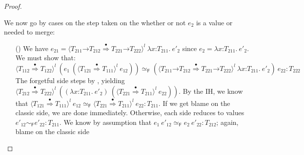 \documentclass[9pt]{extarticle}
\newcommand{\ottnt}[1]{\mathit{#1}}
\newcommand{\ottsym}[1]{#1}
\begin{document}
{\begin{lemma}
\begin{proof}
{\begin{itemize}
      We now go by cases on the step taken on the whether or not
      $\ottnt{e_{{\mathrm{2}}}}$ is a value or needed to merge:
\begin{itemize}
      \item[(\V{ProxyF})] We have $\ottnt{e_{{\mathrm{21}}}}  \ottsym{=}   \langle   \ottnt{T_{{\mathrm{211}}}} \mathord{ \rightarrow } \ottnt{T_{{\mathrm{212}}}}   \mathord{ \overset{\bullet}{\Rightarrow} }   \ottnt{T_{{\mathrm{221}}}} \mathord{ \rightarrow } \ottnt{T_{{\mathrm{222}}}}   \rangle^{ \ottnt{l} } ~   \lambda \mathit{x} \mathord{:} \ottnt{T_{{\mathrm{211}}}} .~  \ottnt{e'_{{\mathrm{2}}}}  $ since $\ottnt{e_{{\mathrm{2}}}}  \ottsym{=}   \lambda \mathit{x} \mathord{:} \ottnt{T_{{\mathrm{211}}}} .~  \ottnt{e'_{{\mathrm{2}}}} $. We must show that:
\[   \langle  \ottnt{T_{{\mathrm{112}}}}  \mathord{ \overset{\bullet}{\Rightarrow} }  \ottnt{T_{{\mathrm{122}}}}  \rangle^{ \ottnt{l} } ~   (  \ottnt{e_{{\mathrm{1}}}} ~  (  \langle  \ottnt{T_{{\mathrm{121}}}}  \mathord{ \overset{\bullet}{\Rightarrow} }  \ottnt{T_{{\mathrm{111}}}}  \rangle^{ \ottnt{l} } ~  \ottnt{e_{{\mathrm{12}}}}  )   )     \simeq _{  \mathsf{F}  }    (  \langle   \ottnt{T_{{\mathrm{211}}}} \mathord{ \rightarrow } \ottnt{T_{{\mathrm{212}}}}   \mathord{ \overset{\bullet}{\Rightarrow} }   \ottnt{T_{{\mathrm{221}}}} \mathord{ \rightarrow } \ottnt{T_{{\mathrm{222}}}}   \rangle^{ \ottnt{l} } ~   \lambda \mathit{x} \mathord{:} \ottnt{T_{{\mathrm{211}}}} .~  \ottnt{e'_{{\mathrm{2}}}}   )  ~ \ottnt{e_{{\mathrm{22}}}}   :  \ottnt{T_{{\mathrm{222}}}}  \]
The forgetful side steps by ,
        yielding $ \langle  \ottnt{T_{{\mathrm{212}}}}  \mathord{ \overset{\bullet}{\Rightarrow} }  \ottnt{T_{{\mathrm{222}}}}  \rangle^{ \ottnt{l} } ~   (   (  \lambda \mathit{x} \mathord{:} \ottnt{T_{{\mathrm{211}}}} .~  \ottnt{e'_{{\mathrm{2}}}}  )  ~  (  \langle  \ottnt{T_{{\mathrm{221}}}}  \mathord{ \overset{\bullet}{\Rightarrow} }  \ottnt{T_{{\mathrm{211}}}}  \rangle^{ \ottnt{l} } ~  \ottnt{e_{{\mathrm{22}}}}  )   )  $.
By the IH, we know that $  \langle  \ottnt{T_{{\mathrm{121}}}}  \mathord{ \overset{\bullet}{\Rightarrow} }  \ottnt{T_{{\mathrm{111}}}}  \rangle^{ \ottnt{l} } ~  \ottnt{e_{{\mathrm{12}}}}    \simeq _{  \mathsf{F}  }   \langle  \ottnt{T_{{\mathrm{221}}}}  \mathord{ \overset{\bullet}{\Rightarrow} }  \ottnt{T_{{\mathrm{211}}}}  \rangle^{ \ottnt{l} } ~  \ottnt{e_{{\mathrm{22}}}}   :  \ottnt{T_{{\mathrm{211}}}} $. If we get blame on the classic side, we are
        done immediately.  Otherwise, each side reduces to values
        $ \ottnt{e'_{{\mathrm{12}}}}   \sim _{  \mathsf{F}  }  \ottnt{e'_{{\mathrm{22}}}}  :  \ottnt{T_{{\mathrm{211}}}} $. We know by assumption that $  \ottnt{e_{{\mathrm{1}}}} ~ \ottnt{e'_{{\mathrm{12}}}}    \simeq _{  \mathsf{F}  }   \ottnt{e_{{\mathrm{2}}}} ~ \ottnt{e'_{{\mathrm{22}}}}   :  \ottnt{T_{{\mathrm{212}}}} $; again, blame on the classic side

\end{itemize}
\end{itemize}}
\end{proof}
\end{lemma}}
\end{document}
